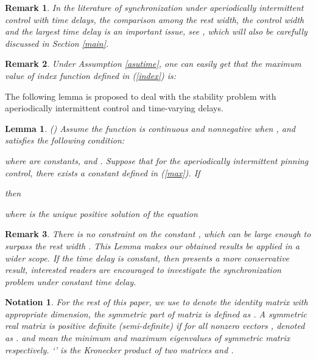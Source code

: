 \documentclass[review]{elsarticle}
\newtheorem{lem}{Lemma}
\newtheorem{rem}{Remark}
\newtheorem{tion}{Notation}
\begin{document}
\begin{rem}
In the literature of synchronization under aperiodically intermittent control with time delays, the comparison among the rest width, the control width and the largest time delay  is an important issue, see \cite{LC15}, which will also be carefully discussed in Section \ref{main}.
\end{rem}

\begin{rem}
Under Assumption \ref{asutime}, one can easily get that the maximum value of index function  defined in (\ref{index}) is:

\end{rem}



The following lemma is proposed to deal with the stability problem with aperiodically intermittent control and time-varying delays.

\begin{lem}\label{synlem}
(\cite{LC15}) Assume the function  is continuous and nonnegative when , and satisfies the following condition:

where  are constants, and .  Suppose that for the aperiodically intermittent pinning control, there exists a constant  defined in (\ref{max}). If

then

where  is the unique positive solution of the equation

\end{lem}

\begin{rem}
There is no constraint on the constant , which can be large enough to surpass the rest width . This Lemma makes our obtained results be applied in a wider scope. If the time delay is constant, then \cite{LLC15} presents a more conservative result, interested readers are encouraged to investigate the synchronization problem under constant time delay.
\end{rem}

\begin{tion}
For the rest of this paper, we use
 to denote the identity matrix with appropriate dimension, the symmetric part of matrix  is defined as . A symmetric real matrix  is positive definite
(semi-definite) if  for all nonzero vectors , denoted as .  and  mean the minimum and maximum eigenvalues of symmetric matrix  respectively. `' is the Kronecker product of two matrices  and .
\end{tion}
\end{document}
